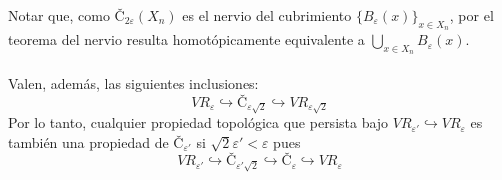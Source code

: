 \documentclass[12pt,a4paper]{article}
\begin{document}
\begin{figure}[H]
\begin{subfigure}{0.3\textwidth}
\end{subfigure}
\end{figure}
Notar que, como $Č_{2 \varepsilon}(X_n)$ es el nervio del cubrimiento $\{B_\varepsilon(x)\}_{x \in X_n}$, por el teorema del nervio resulta homotópicamente equivalente a $\displaystyle \bigcup_{x \in X_n} B_\varepsilon(x)$.
\\
\\
Valen, además, las siguientes inclusiones:
\[
VR_\varepsilon \hookrightarrow Č_{\varepsilon\sqrt{2}} \hookrightarrow VR_{\varepsilon\sqrt{2}}
\]
Por lo tanto, cualquier propiedad topológica que persista bajo $VR_{\varepsilon'} \hookrightarrow VR_{\varepsilon}$ es también una propiedad de $Č_{\varepsilon'}$ si $\sqrt{2}\varepsilon'< \varepsilon$ pues
\[
VR_{\varepsilon'} \hookrightarrow Č_{\varepsilon' \sqrt{2}} \hookrightarrow Č_\varepsilon \hookrightarrow VR_\varepsilon
\]
\end{document}
